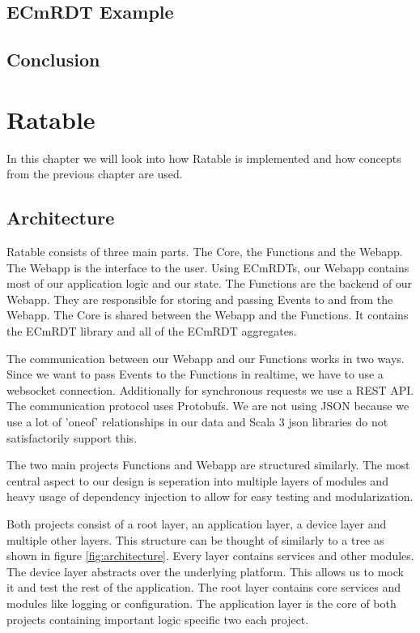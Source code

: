 \documentclass[
	ngerman,
	ruledheaders=section,   %
	class=report,		    %
	thesis={type=bachelor}, %
	accentcolor=9c,			%
	custommargins=false,    %
	marginpar=false,        %
	parskip=half-,          %
	fontsize=11pt,          %
]{tudapub}
\begin{document}
\section{ECmRDT Example}
\section{Conclusion}

\chapter{Ratable}
In this chapter we will look into how Ratable is implemented and how concepts from the previous chapter are used.

\section{Architecture}
Ratable consists of three main parts. The Core, the Functions and the Webapp. The Webapp is the interface to the user. Using ECmRDTs, our Webapp contains most of our application logic and our state. The Functions are the backend of our Webapp. They are responsible for storing and passing Events to and from the Webapp. The Core is shared between the Webapp and the Functions. It contains the ECmRDT library and all of the ECmRDT aggregates.

The communication between our Webapp and our Functions works in two ways. Since we want to pass Events to the Functions in realtime, we have to use a websocket connection. Additionally for synchronous requests we use a REST API. The communication protocol uses Protobufs. We are not using JSON because we use a lot of 'oneof' relationships in our data and Scala 3 json libraries do not satisfactorily support this.

The two main projects Functions and Webapp are structured similarly. The most central aspect to our design is seperation into multiple layers of modules and heavy usage of dependency injection to allow for easy testing and modularization.

Both projects consist of a root layer, an application layer, a device layer and multiple other layers. This structure can be thought of similarly to a tree as shown in figure \ref{fig:architecture}. Every layer contains services and other modules. The device layer abstracts over the underlying platform. This allows us to mock it and test the rest of the application. The root layer contains core services and modules like logging or configuration. The application layer is the core of both projects containing important logic specific two each project.
\end{document}
